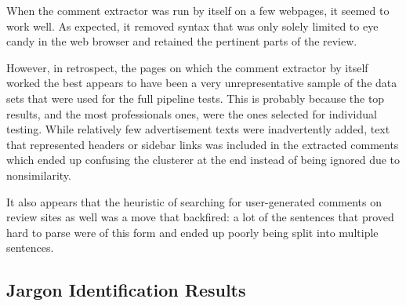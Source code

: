 \documentclass{article}
\begin{document}
When the comment extractor was run by itself on a few webpages, it seemed to
work well. As expected, it removed syntax that was only solely limited to eye
candy in the web browser and retained the pertinent parts of the review.

However, in retrospect, the pages on which the comment extractor by itself
worked the best appears to have been a very unrepresentative sample of the data
sets that were used for the full pipeline tests. This is probably because the
top results, and the most professionals ones, were the ones selected for
individual testing. While relatively few advertisement texts were inadvertently
added, text that represented headers or sidebar links was included in the
extracted comments which ended up confusing the clusterer at the end instead of
being ignored due to nonsimilarity.

It also appears that the heuristic of searching for user-generated comments on
review sites as well was a move that backfired: a lot of the sentences that
proved hard to parse were of this form and ended up poorly being split into
multiple sentences.

\subsection{Jargon Identification Results} %
\end{document}
